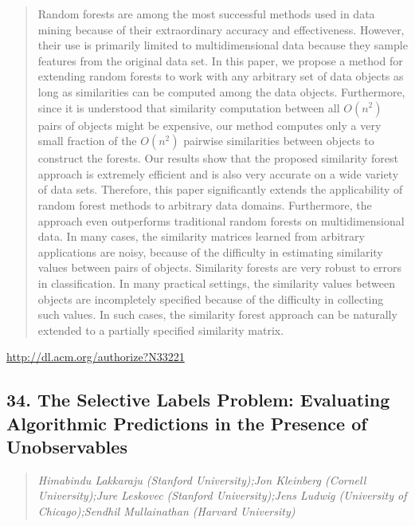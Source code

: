 \documentclass{article}
\begin{document}
\begin{quote}
Random forests are among the most successful methods used in data mining because of their extraordinary accuracy and effectiveness. However, their use is primarily limited to multidimensional data because they sample features from the original data set. In this paper, we propose a method for extending random forests to work with any arbitrary set of data objects as long as similarities can be computed among the data objects. Furthermore, since it is understood that similarity computation between all $O(n^2)$ pairs of objects might be expensive, our method computes only a very small fraction of the $O(n^2)$ pairwise similarities between objects to construct the forests. Our results show that the proposed similarity forest approach is extremely efficient and is also very accurate on a wide variety of data sets. Therefore, this paper significantly extends the applicability of random forest methods to arbitrary data domains. Furthermore, the approach even outperforms traditional random forests on multidimensional data. In many cases, the similarity matrices learned from arbitrary applications are noisy, because of the difficulty in estimating similarity values between pairs of objects. Similarity forests are very robust to errors in classification. In many practical settings, the similarity values between objects are incompletely specified because of the difficulty in collecting such values. In such cases, the similarity forest approach can be naturally extended to a partially specified similarity matrix.
\end{quote}

\href{http://dl.acm.org/authorize?N33221}{http://dl.acm.org/authorize?N33221}

\subsection{34. The Selective Labels Problem: Evaluating Algorithmic Predictions in the Presence of Unobservables}

\begin{quote}
\footnotesize{\textit{Himabindu Lakkaraju (Stanford University);Jon Kleinberg (Cornell University);Jure Leskovec (Stanford University);Jens Ludwig (University of Chicago);Sendhil Mullainathan (Harvard University)}}

\end{quote}
\end{document}
